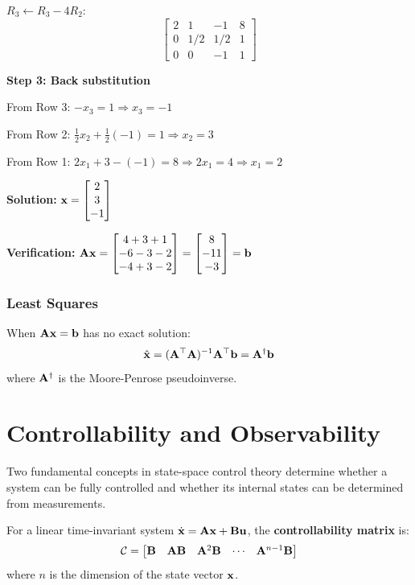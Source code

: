 \begin{examplebox}[title=Example: Solving a System Using Gaussian Elimination]
$R_3 \leftarrow R_3 - 4R_2$:
\[
\left[\begin{array}{ccc|c} 2 & 1 & -1 & 8 \\ 0 & 1/2 & 1/2 & 1 \\ 0 & 0 & -1 & 1 \end{array}\right]
\]

\textbf{Step 3: Back substitution}

From Row 3: $-x_3 = 1 \Rightarrow x_3 = -1$

From Row 2: $\frac{1}{2}x_2 + \frac{1}{2}(-1) = 1 \Rightarrow x_2 = 3$

From Row 1: $2x_1 + 3 - (-1) = 8 \Rightarrow 2x_1 = 4 \Rightarrow x_1 = 2$

\textbf{Solution:} $\mathbf{x} = \begin{bmatrix} 2 \\ 3 \\ -1 \end{bmatrix}$

\textbf{Verification:} $\mathbf{A}\mathbf{x} = \begin{bmatrix} 4+3+1 \\ -6-3-2 \\ -4+3-2 \end{bmatrix} = \begin{bmatrix} 8 \\ -11 \\ -3 \end{bmatrix} = \mathbf{b}$ \checkmark
\end{examplebox}

\subsubsection{Least Squares}
When $\mathbf{A}\mathbf{x} = \mathbf{b}$ has no exact solution:
\begin{equation}
\hat{\mathbf{x}} = (\mathbf{A}^\top\mathbf{A})^{-1}\mathbf{A}^\top\mathbf{b} = \mathbf{A}^\dagger\mathbf{b}
\end{equation}
where $\mathbf{A}^\dagger$ is the Moore-Penrose pseudoinverse.

\section{Controllability and Observability}

Two fundamental concepts in state-space control theory determine whether a system can be fully controlled and whether its internal states can be determined from measurements.

\begin{definitionbox}[title=Definition 0.7: Controllability Matrix]
For a linear time-invariant system $\dot{\mathbf{x}} = \mathbf{A}\mathbf{x} + \mathbf{B}\mathbf{u}$, the \textbf{controllability matrix} is:
\begin{equation}
\mathcal{C} = \begin{bmatrix} \mathbf{B} & \mathbf{A}\mathbf{B} & \mathbf{A}^2\mathbf{B} & \cdots & \mathbf{A}^{n-1}\mathbf{B} \end{bmatrix}
\end{equation}
where $n$ is the dimension of the state vector $\mathbf{x}$.
\end{definitionbox}

